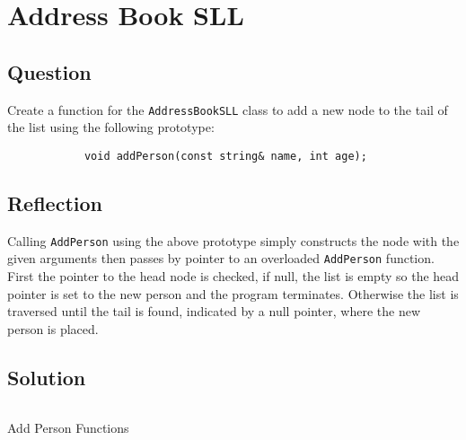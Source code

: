\section{Address Book SLL}
    \subsection*{Question}
        Create a function for the \texttt{AddressBookSLL} class
        to add a new node to the tail of the list using the following
        prototype:
        \begin{verbatim}
            void addPerson(const string& name, int age);
        \end{verbatim}

    \subsection*{Reflection}
        Calling \texttt{AddPerson} using the above prototype simply
        constructs the node with the given arguments then passes by pointer to
        an overloaded \texttt{AddPerson} function.
        First the pointer to the head node is checked, if null, the list is empty
        so the head pointer is set to the new person and the program terminates.
        Otherwise the list is traversed until the tail is found,
        indicated by a null pointer, where the new person is placed.

    \subsection*{Solution}
        \begin{listing}[H]
            \inputminted[firstline=22]{cpp}{../Tasks/02-AddressBookSLL/AddressBookSLL.cpp}
            \caption{Add Person Functions}
        \end{listing}